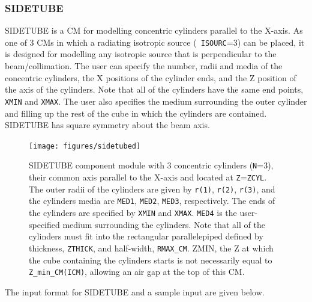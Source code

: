 \documentclass[12pt,twoside]{article}
\begin{document}
\clearpage

\subsubsection{SIDETUBE}
\renewcommand{\rightmark}{SIDETUBE CM}

SIDETUBE is a CM for modelling concentric cylinders parallel to the
X-axis.  As one of 3 CMs in which a  radiating isotropic source ({\tt
ISOURC}=3) can be placed, it is designed for modelling any isotropic
source that is perpendicular to the beam/collimation.  The user can
specify the number, radii and media of the concentric cylinders, the X
positions of the cylinder ends, and the Z position of the axis of the
cylinders.  Note that all of the cylinders have the same end points, {\tt
XMIN} and {\tt XMAX}.  The user also specifies the medium surrounding the
outer cylinder and filling up the rest of the cube in which the cylinders
are contained.  SIDETUBE has square symmetry about the beam axis.

\begin{figure}[htbp]
\begin{center}
\leavevmode
\mbox{}\hspace{0cm}
\texttt{[image: figures/sidetubed]}
\end{center}
\caption[SIDETUBE CM geometry.]
{SIDETUBE component module with 3 concentric cylinders ({\tt N}=3),
their common axis parallel to the X-axis and located at {\tt Z}={\tt ZCYL}.
The outer radii of the cylinders are given by {\tt r(1)}, {\tt r(2)},
{\tt r(3)}, and the
cylinders media are {\tt MED1}, {\tt MED2}, {\tt MED3}, respectively.  The
ends of the cylinders are specified by {\tt XMIN} and {\tt XMAX}.  {\tt MED4} is the user-specified medium surrounding the cylinders.  Note that all of the cylinders must fit
into the rectangular parallelepiped
defined by thickness, {\tt ZTHICK}, and half-width, {\tt RMAX\_CM}.  ZMIN,
the Z at which the cube containing the cylinders starts is not necessarily
equal to {\tt Z\_min\_CM(ICM)}, allowing an air gap at the top of this CM.}
\label{fig_SIDETUBED}
\end{figure}
\clearpage

The input format for SIDETUBE and a sample input are given below.

\begin{small}

\end{small}
\end{document}
